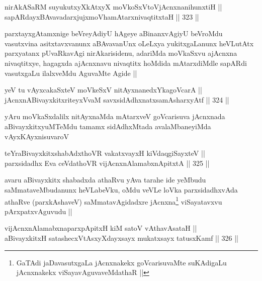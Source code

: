 \begin{shl}
nirAkASaRM suyukutxyXkAtxyX moVkoSxV\s toV\s jAcnxnanihunxtiH || \\
sapARdayxBAvavadarxjujxmoVhamAtarxnivaqtitxtaH ||  323 ||  
\end{shl}

\begin{artha}
parxtayxgAtamxnige beVreyAdiyU hAgeye aBinanxvAgiyU beVroMdu
vasutxvina asitxtavxvanunx aBAvavanUnx oLeLxya yukitxgaLanunx
heVLutAtx parxyatanx pUvaRkavAgi nirAkarisidenu, adariMda moVkaSxvu
ajAcnxna nivaqtitxye, hagagxda ajAcnxnavu nivaqtitx hoMdida
mAtarxdiMdle sapARdi vasutxgaLu ilalxveMdu AguvaMte Agide ||
\end{artha}


\begin{shl}
yeV tu vAyxcakaSxteV moVkeSxV nitAyxnanedxYkagoVcarA || \\
jAcnxnABivayxkitxriteyxVvaM savxsidAdhxnatxsamAsharxyAtf ||  324 ||  
\end{shl}

\begin{artha}
yAru moVkaSxdalilx nitAyxnaMda mAtarxveV goVcarisuva jAcnxnada
aBivayxkitxyuMTeMdu tamamx sidAdhxMtada avalaMbaneyiMda vAyxKAyxnisuvaroV
\end{artha}

\begin{shl}
teYraBivayxkitxshabAdxthoVR vakatxvayxH kiVdaqgiSayxteV || \\
parxsidadhx Eva ceVdathoVR vijAcnxnAlamabxnApitxtA ||  325 ||  
\end{shl}

\begin{artha}
avaru aBivayxkitx shabadxda athaRvu yAva tarahe ide yeMbudu
saMmataveMbudanunx heVLabeVku, oMdu veVLe loVka parxsidadhxvAda
athaRve (parxkAshaveV) saMmatavAgidadxre jAcnxna\footnote{GaTAdi
  jaDavasutxgaLa jAcnxnakekx goVcarisuvaMte suKAdigaLu jAcnxnakekx
  viSayavAguvaveMdathaR ||}
viSayatavxvu pArxpatxvAguvudu ||
\end{artha}


\begin{shl}
vijAcnxnAlamabxnaparxpApitxH kiM satoV vA\s thavA\s sataH || \\
aBivayxkitxH satashecxVtAsxyXdayxsayx mukatxsayx tatusxKamf ||  326 ||  
\end{shl}
				
